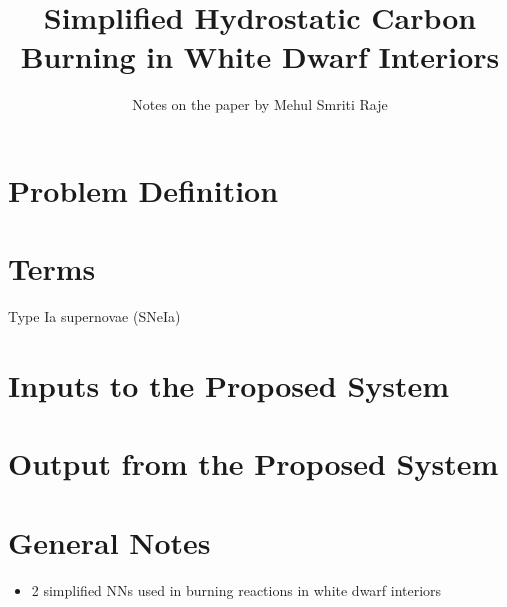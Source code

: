 \documentclass[11pt]{article}
\title{Simplified Hydrostatic Carbon Burning in White Dwarf Interiors}
\author{Notes on the paper by Mehul Smriti Raje}
\begin{document}
\maketitle{}

\section{Problem Definition}

\section{Terms}
Type Ia supernovae (SNeIa)

\section{Inputs to the Proposed System}

\section{Output from the Proposed System}

\section{General Notes}
	\begin{itemize}
		\item 2 simplified NNs used in burning reactions in white dwarf interiors
	\end{itemize}
\end{document}
